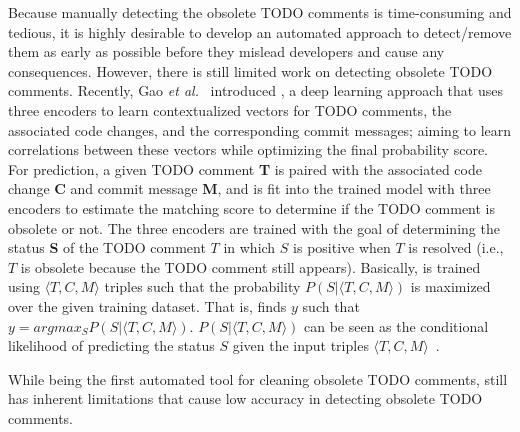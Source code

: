 Because manually detecting the obsolete TODO comments is
time-consuming and tedious, it is highly desirable to develop an
automated approach to detect/remove them as early as possible before
they mislead developers and cause any consequences. However, there is
still limited work on detecting obsolete TODO comments. Recently, Gao
{\em et al.}~\cite{tdcleaner-fse21} introduced \tdcleaner, a deep
learning approach that uses three encoders to learn contextualized
vectors for TODO comments, the associated code changes, and the 
corresponding commit messages; aiming to learn correlations between
these vectors while optimizing the final probability 
score. For prediction, a given TODO comment {\bf T} is paired with 
the associated code change {\bf C} and commit message {\bf M}, and is fit 
into the trained \tdcleaner model
with three encoders to estimate the matching score to determine if the
TODO comment is obsolete or not. The three encoders are trained with
the goal of determining the status {\bf S} of the TODO comment $T$ in
which $S$ is positive when $T$ is resolved (i.e., $T$ is obsolete
because the TODO comment still appears). Basically, \tdcleaner is
trained using $\langle T, C, M \rangle$ triples such that the
probability $P(S | \langle T, C, M \rangle)$ is maximized over the
given training dataset. That is, \tdcleaner finds $y$ such that $y =
argmax_S P (S | \langle T, C, M \rangle)$. $P(S | \langle T, C, M
\rangle)$ can be seen as the conditional likelihood of predicting the
status $S$ given the input triples $\langle T, C, M
\rangle$~\cite{tdcleaner-fse21}.

While being the first automated tool for cleaning obsolete TODO
comments, \tdcleaner still has inherent limitations that cause low
accuracy in detecting obsolete TODO comments.

